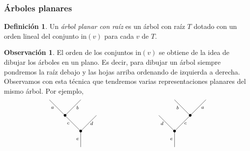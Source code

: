 \documentclass[11pt,a4paper,openright,oneside]{article}
\numberwithin{equation}{section}
\theoremstyle{definition}
\newtheorem{defi}[teo]{Definici\'on}
\newtheorem{obs}[teo]{Observaci\'on}
\begin{document}
\subsubsection{\'Arboles planares}
\begin{defi}
    Un \emph{\'arbol planar con ra\'iz} es un \'arbol con ra\'iz $T$ dotado con un orden lineal del conjunto in$(v)$ para cada $v$ de $T$.
\end{defi}
\begin{obs}
    El orden de los conjuntos in$(v)$ se obtiene de la idea de dibujar los \'arboles en un plano. Es decir, para dibujar un \'arbol siempre pondremos la ra\'iz debajo y las hojas arriba ordenando de izquierda a derecha.
    Observamos con esta t\'ecnica que tendremos varias representaciones planares del mismo \'arbol. Por ejemplo,
    \begin{equation}
        \xy
        <0.08cm, 0cm>:
        (0.0, 0.0)*{}="1"; %
        (0.0, 10.0)*=0{\bullet}="2"; %
        (-10.0, 20.0)*=0{\bullet}="3"; %
        (-20.0, 30.0)*{}="4"; %
        (0.0, 30.0)*{}="5"; %
        (10.0, 20.0)*{}="6"; %
        "1";"2" **\dir{-};
        "2";"3" **\dir{-};
        "3";"4" **\dir{-};
        "3";"5" **\dir{-};
        "2";"6" **\dir{-};
        (-2.0, 5.0)*=0{\scriptstyle e};
        (-8.0, 15.0)*=0{\scriptstyle c};
        (-18.0, 25.0)*=0{\scriptstyle a};
        (-2, 25.0)*=0{\scriptstyle b};
        (7.0, 15.0)*=0{\scriptstyle d};
        \endxy
        \xy
        <0.08cm, 0cm>:
        (-20, 0.0)*{}="1";
        (20, 0.0)*{}="2";
        \endxy
        \xy
        <0.08cm, 0cm>:
        (0.0, 0.0)*{}="1"; %
        (0.0, 10.0)*=0{\bullet}="2"; %
        (-10.0, 20.0)*{}="3"; %
        (10.0, 20.0)*=0{\bullet}="4"; %
        (0.0, 30.0)*{}="5"; %
        (20.0, 30.0)*{}="6"; %
        "1";"2" **\dir{-};
        "2";"3" **\dir{-};
        "2";"4" **\dir{-};
        "4";"5" **\dir{-};
        "4";"6" **\dir{-};
        (-2.0, 5.0)*=0{\scriptstyle e};
        (-8.0, 15.0)*=0{\scriptstyle d};
        (7.0, 15.0)*=0{\scriptstyle c};
        (2.0, 25.0)*=0{\scriptstyle b};
        (18, 25.0)*=0{\scriptstyle a};
        \endxy
    \end{equation}
\end{obs}
\end{document}

